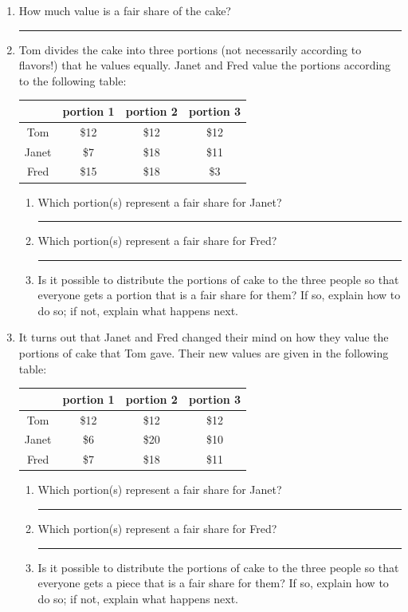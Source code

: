 \documentclass[12pt]{article}
\newcommand{\ans}[1][1in]{\rule{#1}{.5pt}}
\begin{document}
\begin{enumerate}
\item How much value is a fair share of the cake? \ans

\item Tom divides the cake into three portions (not necessarily according to flavors!) that he values equally. Janet and Fred value the portions according to the following table:

\begin{center}
\begin{tabular}{| c | c | c | c |}
\hline
& portion 1& portion 2 & portion 3\\ \hline \hline
Tom & \$12 & \$12 & \$12 \\ \hline
Janet & \$7 & \$18 & \$11 \\ \hline
Fred & \$15 & \$18 & \$3\\ \hline
\end{tabular}
\end{center}

\begin{enumerate}
\item Which portion(s) represent a fair share  for Janet? \ans[2in]
\item Which portion(s) represent a fair share  for Fred? \ans[2in]
\item Is it possible to distribute the portions of cake to the three people so that everyone gets a portion that is a fair share for them? If so, explain how to do so; if not, explain what happens next.

\vfill
\end{enumerate}

\item It turns out that Janet and Fred changed their mind on how they value the portions of cake that Tom gave. Their new values are given in the following table:
\begin{center}
\begin{tabular}{| c | c | c | c |}
\hline
& portion 1& portion 2 & portion 3\\ \hline \hline
Tom & \$12 & \$12 & \$12 \\ \hline
Janet & \$6 & \$20 & \$10 \\ \hline
Fred & \$7 & \$18 & \$11 \\ \hline
\end{tabular}
\end{center}

\begin{enumerate}
\item Which portion(s) represent a fair share  for Janet? \ans[2in]
\item Which portion(s) represent a fair share  for Fred? \ans[2in]
\item Is it possible to distribute the portions of cake to the three people so that everyone gets a piece that is a fair share for them? If so, explain how to do so; if not, explain what happens next.


\end{enumerate}
\end{enumerate}
\end{document}
